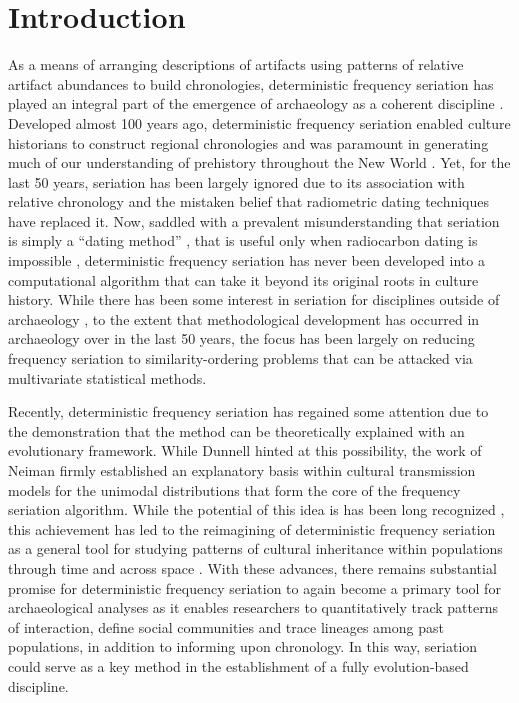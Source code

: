 \documentclass[10pt,letterpaper]{article}
\begin{document}
\linenumbers

\section*{Introduction}
As a means of arranging descriptions of artifacts using patterns of relative artifact abundances to build chronologies, deterministic frequency seriation has played an integral part of the emergence of archaeology as a coherent discipline \cite{lyman1997rise}. Developed almost 100 years ago, deterministic frequency seriation enabled culture historians to construct regional chronologies and was paramount in generating much of our understanding of prehistory throughout the New World \cite{Beals1945,Bluhm1951,Evans1955,Ford1949,Kidder1917,Mayer-Oakes1955,Meggers1957,Phillips1951,Rouse1939,Smith1950}. Yet, for the last 50 years, seriation has been largely ignored due to its association with relative chronology and the mistaken belief that radiometric dating techniques have replaced it. Now, saddled with a prevalent misunderstanding that seriation is simply a ``dating method'' \cite{Michels1972}, that is useful only when radiocarbon dating is impossible \cite{Wikipedia.com2014}, deterministic frequency seriation has never been developed into a computational algorithm that can take it beyond its original roots in culture history. While there has been some interest in seriation for disciplines outside of archaeology \cite{Arangala2013,Buetow1987,Muller1983Geographic,smith1996seriation}, to the extent that methodological development has occurred in archaeology over in the last 50 years, the focus has been largely on reducing frequency seriation to similarity-ordering problems that can be attacked via multivariate statistical methods. 

Recently, deterministic frequency seriation has regained some attention due to the demonstration that the method can be theoretically explained with an evolutionary framework. While Dunnell \cite{Dunnell1978,Dunnell1982} hinted at this possibility, the work of Neiman \cite{Neiman1995} firmly established an explanatory basis within cultural transmission models for the unimodal distributions that form the core of the frequency seriation algorithm. While the potential of this idea is has been long recognized \cite{Driver1932}, this achievement has led to the reimagining of deterministic frequency seriation as a general tool for studying patterns of cultural inheritance within populations through time and across space \cite{Eerkens2005,Eerkens2007,Harpole2002,Kroeber1919,Lipo1997Population,Lipo2001,lyman2006seriation,Mallios2014,o2000applying,Rafferty1994,Rafferty2008,Smith2005,Teltser1995}. With these advances, there remains substantial promise for deterministic frequency seriation to again become a primary tool for archaeological analyses as it enables researchers to quantitatively track patterns of interaction, define social communities and trace lineages among past populations, in addition to informing upon chronology.  In this way, seriation could serve as a key method in the establishment of a fully evolution-based discipline.
\end{document}
